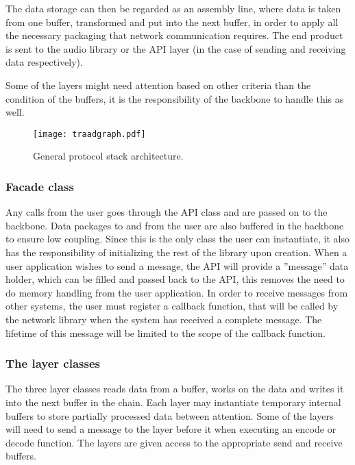 The data storage can then be regarded as an assembly line, where data is taken from one buffer, transformed and put into the next buffer, in order to apply all the necessary packaging that network communication requires. The end product  is sent to the audio library or the API layer (in the case of sending and receiving data respectively).

Some of the layers might need attention based on other criteria than the condition of the buffers, it is the responsibility of the backbone to handle this as well.

\begin{figure}[htb]
	\begin{center}
	\texttt{[image: traadgraph.pdf]}
	\caption{General protocol stack architecture.}
	\label{fig:general_architecture}	
	\end{center}
\end{figure}

\subsubsection{Facade class}
Any calls from the user goes through the API class and are passed on to the backbone. Data packages to and from the user are also buffered in the backbone to ensure low coupling. Since this is the only class the user can instantiate, it also has the responsibility of initializing the rest of the library upon creation.
When a user application wishes to send a message, the API will provide a ''message'' data holder, which can be filled and passed back to the API, this removes the need to do memory handling from the user application.
In order to receive messages from other systems, the user must register a callback function, that will be called by the network library when the system has received a complete message. The lifetime of this message will be limited to the scope of the callback function.

\subsubsection{The layer classes}
The three layer classes reads data from a buffer, works on the data and writes it into the next buffer in the chain. Each layer may instantiate temporary internal buffers to store partially processed data between attention. Some of the layers will need to send a message to the layer before it when executing an encode or decode function. The layers are given access to the appropriate send and receive buffers.


